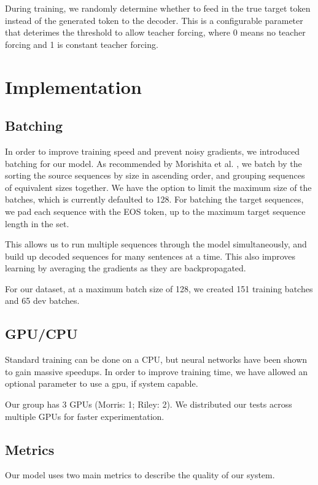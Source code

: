 \documentclass[twoside,twocolumn]{article}
\begin{document}
During training, we randomly determine whether to feed in the true target
token instead of the generated token to the decoder. This is a configurable
parameter that deterimes the threshold to allow teacher forcing, where 0 means
no teacher forcing and 1 is constant teacher forcing.
\section{Implementation}
\label{sec:implementation}
\subsection{Batching}
In order to improve training speed and prevent noisy gradients, we introduced
batching for our model. As recommended by Morishita et al.
\cite{morishita2017empirical}, we batch by the sorting the source sequences by
size in ascending order, and grouping sequences of equivalent sizes together.
We have the option to limit the maximum size of the batches, which is currently
defaulted to 128. For batching the target sequences, we pad each sequence with
the EOS token, up to the maximum target sequence length in the set.

This allows us to run multiple sequences through the model simultaneously,
and build up decoded sequences for many sentences at a time. This also improves
learning by averaging the gradients as they are backpropagated.

For our dataset, at a maximum batch size of 128, we created 151 training
batches and 65 dev batches.
\subsection{GPU/CPU}
Standard training can be done on a CPU, but neural networks have been shown to
gain massive speedups. In order to improve training time,
we have allowed an optional parameter to use a gpu, if system capable.

Our group has 3 GPUs (Morris: 1; Riley: 2). We distributed our tests across
multiple GPUs for faster experimentation.
\subsection{Metrics}
Our model uses two main metrics to describe the quality of our system.
\end{document}
